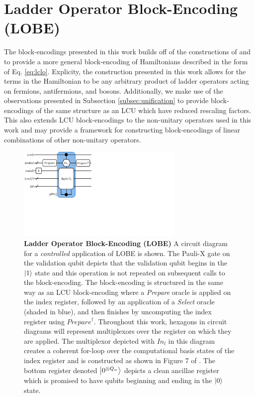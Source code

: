 \section{Ladder Operator Block-Encoding (LOBE)}
\label{sec:lobe}

The block-encodings presented in this work builds off of the constructions of \cite{camps2024explicit} and \cite{liu2024efficient} to provide a more general block-encoding of Hamiltonians described in the form of Eq. \ref{eq:lclo}.
Explicity, the construction presented in this work allows for the terms in the Hamiltonian to be any arbitrary product of ladder operators acting on fermions, antifermions, and bosons.
Additionally, we make use of the observations presented in Subsection \ref{subsec:unification} to provide block-encodings of the same structure as an LCU which have reduced rescaling factors.
This also extends LCU block-encodings to the non-unitary operators used in this work and may provide a framework for constructing block-encodings of linear combinations of other non-unitary operators.

\begin{figure}
    \centering
    \includegraphics[width=8cm]{figures/lobe.pdf}
    \caption{
        \textbf{Ladder Operator Block-Encoding (LOBE)}
        A circuit diagram for a \textit{controlled} application of LOBE is shown. 
        The Pauli-X gate on the validation qubit depicts that the validation qubit begins in the $\ket{1}$ state and this operation is not repeated on subsequent calls to the block-encoding.
        The block-encoding is structured in the same way as an LCU block-encoding where a \textit{Prepare} oracle is applied on the index register, followed by an application of a \textit{Select} oracle (shaded in blue), and then finishes by uncomputing the index register using $\textit{Prepare}^\dagger$.
        Throughout this work, hexagons in circuit diagrams will represent multiplexors over the register on which they are applied.
        The multiplexor depicted with $\textit{In}_l$ in this diagram creates a coherent for-loop over the computational basis states of the index register and is constructed as shown in Figure 7 of \cite{babbush2018encoding}.
        The bottom register denoted $\ket{0^{\otimes Q_\alpha}}$ depicts a clean ancillae register which is promised to have qubits beginning and ending in the $\ket{0}$ state.
    }
    \label{fig:lobe}
\end{figure}

